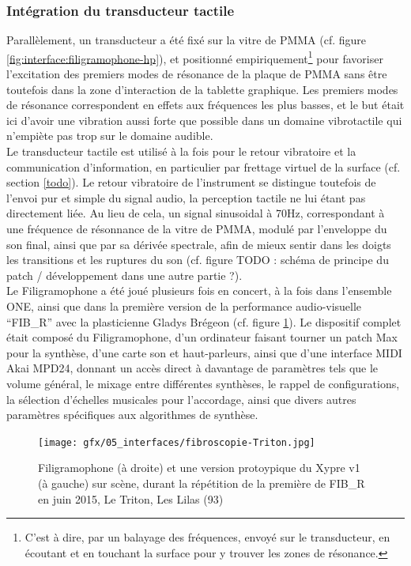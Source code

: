 \subsubsection{Intégration du transducteur tactile}

\noindent Parallèlement, un transducteur a été fixé sur la vitre de \gls{PMMA} (cf. figure \ref{fig:interface:filigramophone-hp}), et positionné empiriquement\footnote{C'est à dire, par un balayage des fréquences, envoyé sur le transducteur, en écoutant et en touchant la surface pour y trouver les zones de résonance.} pour favoriser l'excitation des premiers modes de résonance de la plaque de \gls{PMMA} sans être toutefois dans la zone d'interaction de la tablette graphique. Les premiers modes de résonance correspondent en effets aux fréquences les plus basses, et le but était ici d'avoir une vibration aussi forte que possible dans un domaine vibrotactile qui n'empiète pas trop sur le domaine audible.\\
\indent Le transducteur tactile est utilisé à la fois pour le retour vibratoire et la communication d'information, en particulier par frettage virtuel de la surface (cf. section \ref{todo}). Le retour vibratoire de l'instrument se distingue toutefois de l'envoi pur et simple du signal audio, la perception tactile ne lui étant pas directement liée. Au lieu de cela, un signal sinusoidal à 70Hz, correspondant à une fréquence de résonnance de la vitre de \gls{PMMA}, modulé par l'enveloppe du son final, ainsi que par sa dérivée spectrale, afin de mieux sentir dans les doigts les transitions et les ruptures du son (cf. figure TODO : schéma de principe du patch / développement dans une autre partie ?).\\
\indent Le Filigramophone a été joué plusieurs fois en concert, à la fois dans l'ensemble ONE, ainsi que dans la première version de la performance audio-visuelle ``FIB\_R'' avec la plasticienne Gladys Brégeon (cf. figure \ref{fig:interface:filigramophone-Xypre-Triton}). Le dispositif complet était composé du Filigramophone, d'un ordinateur faisant tourner un patch Max pour la synthèse, d'une carte son et haut-parleurs, ainsi que d'une interface \gls{MIDI} Akai MPD24, donnant un accès direct à davantage de paramètres tels que le volume général, le mixage entre différentes synthèses, le rappel de configurations, la sélection d'échelles musicales pour l'accordage, ainsi que divers autres paramètres spécifiques aux algorithmes de synthèse.

\begin{figure}[!htbp]
	\captionsetup{format=plain}%
	\texttt{[image: gfx/05\_interfaces/fibroscopie-Triton.jpg]}
	\caption{Filigramophone (à droite) et une version protoypique du Xypre v1 (à gauche) sur scène, durant la répétition de la première de FIB\_R en juin 2015, Le Triton, Les Lilas (93)}
	\label{fig:interface:filigramophone-Xypre-Triton}
\end{figure}


